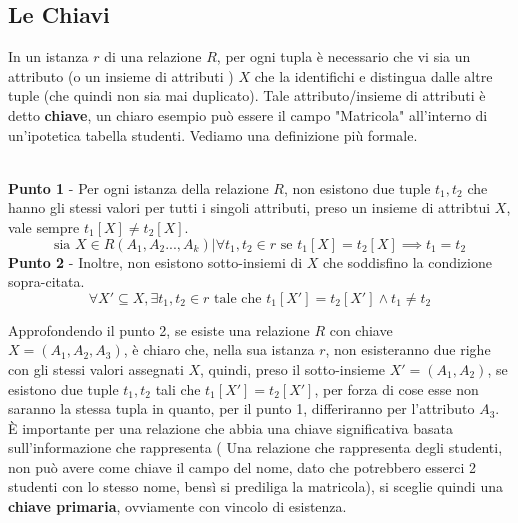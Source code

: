 \documentclass[12pt, letterpaper]{article}
\begin{document}
\subsection{Le Chiavi}
In un istanza \(r\) di una relazione \(R\), per ogni tupla è necessario che vi sia un attributo (o un insieme di attributi ) \(X\)
che la identifichi e distingua dalle altre tuple (che quindi non sia mai duplicato). Tale attributo/insieme di attributi è detto
\textbf{chiave}, un chiaro esempio può essere il campo "Matricola" all'interno di un'ipotetica tabella studenti.
Vediamo una definizione più formale.
\begin{theorem}
    \hphantom{.}\\\textbf{ Punto 1 }- Per ogni istanza della relazione \(R\), non esistono due tuple \(t_1,t_2\) che hanno gli stessi valori
    per tutti i singoli attributi, preso un insieme di attribtui \(X\), vale sempre \(t_1[X]\ne t_2[X]\).
    \begin{equation}
        \text{sia }X\in R(A_1,A_2...,A_k) | \forall t_1,t_2 \in r \text{ se }t_1[X]=t_2[X] \implies t_1=t_2
    \end{equation}
    \textbf{ Punto 2 }- Inoltre, non esistono sotto-insiemi di \(X\) che soddisfino la condizione sopra-citata.
    \begin{equation}
        \forall X'\subseteq X, \exists t_1,t_2 \in r \text{ tale che } t_1[X']=t_2[X'] \land t_1 \ne t_2
    \end{equation}
\end{theorem}
Approfondendo il punto 2, se esiste una relazione \(R\) con chiave \(X=(A_1,A_2,A_3)\), è chiaro che, nella 
sua istanza \(r\), non esisteranno due righe con gli stessi valori assegnati \(X\), quindi, preso il sotto-insieme
\(X'=(A_1,A_2)\), se esistono due tuple \(t_1,t_2\) tali che \(t_1[X']=t_2[X']\), per forza di cose esse non 
saranno la stessa tupla in quanto, per il punto 1, differiranno per l'attributo \(A_3\).
È importante per una relazione che abbia una chiave significativa basata sull'informazione che rappresenta
( Una relazione che rappresenta degli studenti, non può avere come chiave il campo del nome, dato che potrebbero 
esserci 2 studenti con lo stesso nome, bensì si prediliga la matricola), si sceglie quindi una \textbf{chiave primaria},
ovviamente con vincolo di esistenza.
\end{document}
